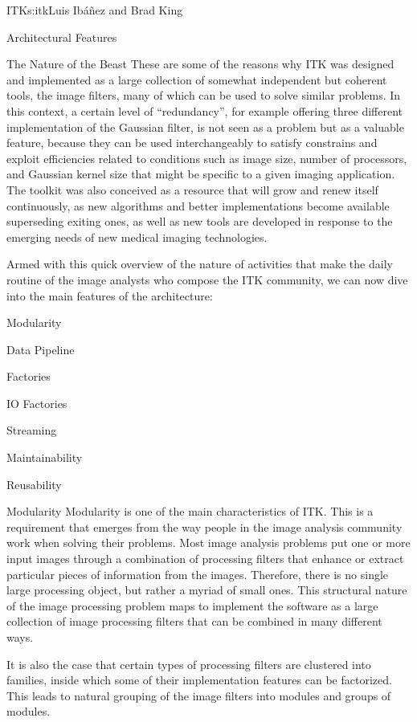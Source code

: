 \begin{aosachapter}{ITK}{s:itk}{Luis Ib\'{a}\~{n}ez and Brad King}
\begin{aosasect1}{Architectural Features}
\begin{aosasect2}{The Nature of the Beast}
These are some of the reasons why ITK was designed and implemented as a large
collection of somewhat independent but coherent tools, the image filters, many
of which can be used to solve similar problems. In this context, a certain
level of ``redundancy'', for example offering three different implementation of
the Gaussian filter, is not seen as a problem but as a valuable feature,
because they can be used interchangeably to satisfy constrains and exploit
efficiencies related to conditions such as image size, number of processors,
and Gaussian kernel size that might be specific to a given imaging application.
The toolkit was also conceived as a resource that will grow and renew itself
continuously, as new algorithms and better implementations become available
superseding exiting ones, as well as new tools are developed in response to the
emerging needs of new medical imaging technologies.

Armed with this quick overview of the nature of activities that make the daily
routine of the image analysts who compose the ITK community, we can now dive
into the main features of the architecture:

\begin{aosaitemize}
\item Modularity
\item Data Pipeline
\item Factories
\item IO Factories
\item Streaming
\item Maintainability
\item Reusability
\end{aosaitemize}

\end{aosasect2}

\begin{aosasect2}{Modularity}
Modularity is one of the main characteristics of ITK. This is a requirement
that emerges from the way people in the image analysis community work when
solving their problems. Most image analysis problems put one or more
input images through a combination of processing filters that enhance or
extract particular pieces of information from the images. Therefore,
there is no single large processing object, but rather a myriad of small ones.
This structural nature of the image processing problem maps to implement the
software as a large collection of image processing filters that can be combined
in many different ways.

It is also the case that certain types of processing filters are clustered into
families, inside which some of their implementation features can be factorized.
This leads to natural grouping of the image filters into modules and groups of
modules.


\end{aosasect2}
\end{aosasect1}
\end{aosachapter}
